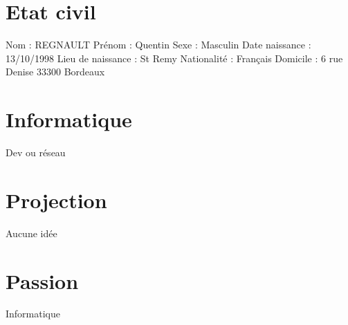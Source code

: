 \documentclass{article}
\begin{document}
\section{Etat civil}
Nom : REGNAULT
\newline
Prénom : Quentin
\newline
Sexe : Masculin
\newline
Date naissance : 13/10/1998
\newline
Lieu de naissance : St Remy
\newline
Nationalité : Français
\newline
Domicile : 6 rue Denise 33300 Bordeaux


\section{Informatique}
Dev ou réseau

\section{Projection}
Aucune idée

\section{Passion}
Informatique
\end{document}
